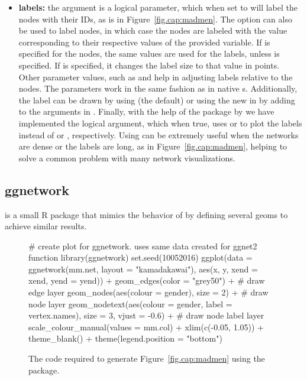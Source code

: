 \begin{itemize}
\item {\bf labels:}  the  argument is a logical parameter, which when set to  will label the nodes with their IDs, as is in Figure~\ref{fig.cap:madmen}. The  option  can also be used to label nodes, in which case the nodes are labeled with the value corresponding to their respective values of the provided variable. If  is specified for the nodes, the same values are used for the labels, unless  is specified. If  is specified, it changes the label size to that value in points. Other parameter values, such as  and  help in adjusting labels relative to the nodes. The parameters work in the same fashion as in native  s. Additionally, the label can be drawn by using  (the default) or using the new  in  by adding  to the arguments in . Finally, with the help of the package  by \citet{ggrepel} we have implemented the logical  argument, which when true, uses  or  to plot the labels instead of  or , respectively. Using  can be extremely useful when the networks are dense or the labels are long, as in Figure~\ref{fig.cap:madmen}, helping to solve a common problem with many network visualizations. 

\end{itemize}

\subsection{ggnetwork} 

 is a small R package that mimics the behavior of  by defining several geoms to achieve similar results. 

\begin{figure}[h]
\begin{example}
# create plot for ggnetwork. uses same data created for ggnet2 function
library(ggnetwork)
set.seed(10052016)
ggplot(data = ggnetwork(mm.net, layout = "kamadakawai"), 
       aes(x, y, xend = xend, yend = yend)) +
  geom_edges(color = "grey50") + # draw edge layer
  geom_nodes(aes(colour = gender), size = 2) + # draw node layer
  geom_nodetext(aes(colour = gender, label = vertex.names),
                size = 3, vjust = -0.6) + # draw node label layer
  scale_colour_manual(values = mm.col) +
  xlim(c(-0.05, 1.05)) +
  theme_blank() +
  theme(legend.position = "bottom")


\end{example}
\caption{\label{fig.cap:madmenggnetwork} The code required to generate Figure~\ref{fig.cap:madmen} using the  package.}
\end{figure}

